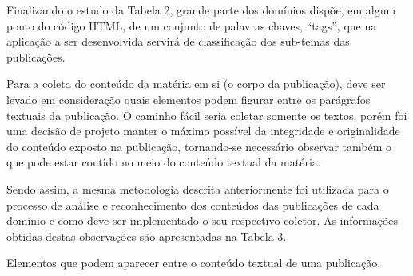 Finalizando o estudo da Tabela 2, grande parte dos domínios dispõe, em algum ponto do código HTML, de um conjunto de palavras chaves, “tags”, que na aplicação a ser desenvolvida servirá de classificação dos sub-temas das publicações.

Para a coleta do conteúdo da matéria em si (o corpo da publicação), deve ser levado em consideração quais elementos podem figurar entre os parágrafos textuais da publicação. O caminho fácil seria coletar somente os textos, porém foi uma decisão de projeto manter o máximo possível da integridade e originalidade do conteúdo exposto na publicação, tornando-se necessário observar também o que pode estar contido no meio do conteúdo textual da matéria. 

Sendo assim, a mesma metodologia descrita anteriormente foi utilizada para o processo de análise e reconhecimento dos conteúdos das publicações de cada domínio e como deve ser implementado o seu respectivo coletor. As informações obtidas destas observações são apresentadas na Tabela 3.

\begin{table}[H]

\noindent\makebox[\textwidth]{%
}
\caption{Elementos que podem aparecer entre o conteúdo textual de uma publicação.}
\end{table}







